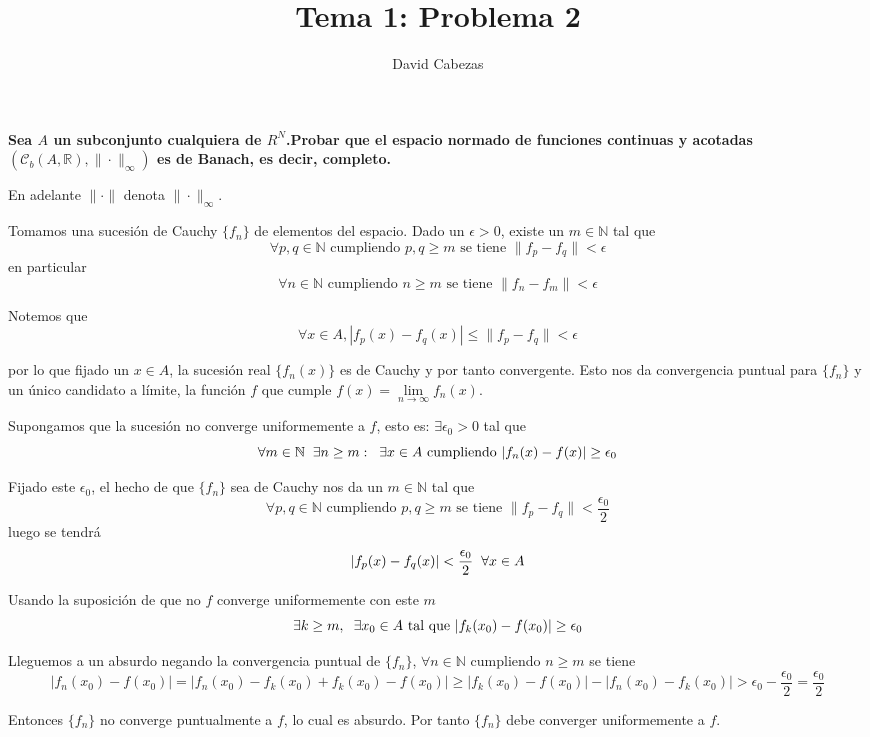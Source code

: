 \documentclass{article}
\begin{document}
\title{Tema 1: Problema 2}
\author{David Cabezas}
\date{}
\maketitle
\begin{flushleft}
  \textbf {Sea $A$ un subconjunto cualquiera de $R^N$.Probar que el
    espacio normado de funciones continuas y acotadas
    $(\mathcal{C}_b(A,\mathbb{R}), \|\cdot\|_\infty)$ es de Banach, es
    decir, completo.}

  En adelante $\|\cdot\|$ denota $\|\cdot\|_\infty$.

  Tomamos una sucesión de Cauchy $\{f_n\}$ de elementos del espacio.
  Dado un $\epsilon>0$, existe un $m \in \mathbb{N}$ tal que
  $$\forall p,q \in \mathbb{N} \text{ cumpliendo }  p,q \geq m \text{ se tiene } \|f_p - f_q\| < \epsilon$$
  en particular
  $$\forall n \in \mathbb{N} \text{ cumpliendo } n \geq m \text{ se
    tiene } \|f_n - f_m\| < \epsilon$$

  Notemos que
  $$\forall x \in A, |f_p(x)-f_q(x)| \leq \|f_p-f_q\| < \epsilon$$

  por lo que fijado un $x \in A$, la sucesión real $\{f_n(x)\}$ es de
  Cauchy y por tanto convergente. Esto nos da convergencia puntual
  para $\{f_n\}$ y un único candidato a límite, la función $f$ que
  cumple $f(x) = \lim\limits_{n \to \infty}f_n(x)$.

  Supongamos que la sucesión no converge uniformemente a $f$, esto es:
  $\exists \epsilon_0 > 0$ tal que
  $$\forall m \in \mathbb{N} \hspace{2mm} \exists n \geq m: \hspace{2mm} \exists x \in A
  \text{ cumpliendo } |f_n(x) - f(x)| \geq \epsilon_0$$

  Fijado este $\epsilon_0$, el hecho de que $\{f_n\}$ sea de Cauchy
  nos da un $m \in \mathbb{N}$ tal que
  $$\forall p, q \in \mathbb{N} \text{ cumpliendo }  p,q \geq m
  \text{ se tiene } \|f_p - f_q\| < \frac{\epsilon_0}{2}$$ luego se
  tendrá
  $$|f_p(x) - f_q(x)| < \frac{\epsilon_0}{2} \hspace{2mm} \forall x
  \in A$$

  Usando la suposición de que no $f$ converge uniformemente con este
  $m$
  $$\exists k \geq m, \hspace{2mm} \exists x_0 \in A \text{ tal que } |f_k(x_0) - f(x_0)| \geq \epsilon_0$$

  Lleguemos a un absurdo negando la convergencia puntual de $\{f_n\}$,
  $\forall n \in \mathbb{N}$ cumpliendo $n \geq m$ se tiene
  $$|f_n(x_0) - f(x_0)| = |f_n(x_0) - f_k(x_0) + f_k(x_0) - f(x_0)| \geq
  |f_k(x_0) - f(x_0)| - |f_n(x_0) - f_k(x_0)| > \epsilon_0 -
\frac{\epsilon_0}{2} = \frac{\epsilon_0}{2}$$

Entonces $\{f_n\}$ no converge puntualmente a $f$, lo cual es absurdo.
Por tanto $\{f_n\}$ debe converger uniformemente a $f$. 
\end{flushleft}
\end{document}
